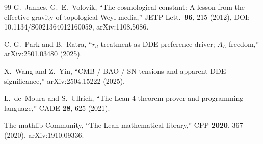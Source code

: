 \documentclass[aps,prd,reprint,nofootinbib,superscriptaddress]{revtex4-2}
\begin{document}
\begin{thebibliography}{99}
G.~Jannes, G.~E.~Volovik,
``The cosmological constant: A lesson from the effective gravity of
topological Weyl media,''
JETP Lett.\ \textbf{96}, 215 (2012),
DOI: 10.1134/S0021364012160059, arXiv:1108.5086.


C.-G.~Park and B.~Ratra,
``$r_d$ treatment as DDE-preference driver; $A_L$ freedom,''
arXiv:2501.03480 (2025).

X.~Wang and Z.~Yin,
``CMB / BAO / SN tensions and apparent DDE significance,''
arXiv:2504.15222 (2025).


L.~de~Moura and S.~Ullrich, ``The Lean 4 theorem prover and programming
language,'' CADE \textbf{28}, 625 (2021).

The mathlib Community,
``The Lean mathematical library,''
CPP \textbf{2020}, 367 (2020), arXiv:1910.09336.

\end{thebibliography}






\end{document}
